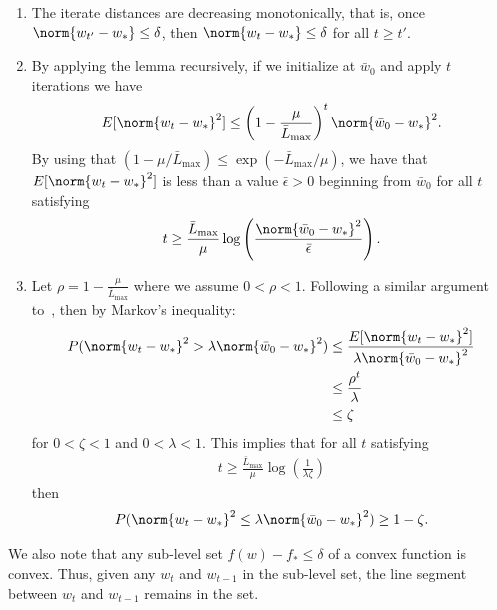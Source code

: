 \documentclass[10pt]{article} %
\begin{document}
\begin{enumerate}
    \item The iterate distances are decreasing monotonically, that is, once $\norm{w_{t'} - w_*} \leq \delta$, then $\norm{w_{t} - w_*} \leq \delta$ for all $t \geq t'$.
    \item By applying the lemma recursively, if we initialize at $\bar{w}_0$ and apply $t$ iterations we have
          \[
              E[\norm{w_t - w_*}^2] \leq \left(1 - \frac{\mu}{\bar{L}_{\text{max}}}\right)^t\norm{\bar{w}_0 - w_*}^2.
          \]
          By using that $(1-\mu/\bar{L}_{\text{max}})\leq \exp(-\bar{L}_{\text{max}}/\mu)$, we have that $E[\norm{w_t - w_*}^2]$ is less than a value $\bar{\epsilon} > 0$ beginning from $\bar{w}_0$ for all $t$ satisfying
          \begin{equation}
              \label{eq:SGDic-temp}
              t \geq \frac{\bar{L}_{\text{max}}}{\mu}\log\left(\frac{\norm{\bar{w}_0 - w_*}^2}{\bar{\epsilon}}\right).
          \end{equation}
    \item Let $\rho = 1 - \frac{\mu}{\bar{L}_{\text{max}}}$ where we assume $0 < \rho < 1$. Following a similar argument to~\cite[Theorem~5]{konevcny2017semi}, then by Markov's inequality:
          \begin{align*}
              P(\norm{w_{t} - w_{*}}^2 > \lambda\norm{\bar{w}_0 - w_{*}}^2)
               & \leq \frac{E[\norm{w_{t} - w_{*}}^2]}{\lambda\norm{\bar{w}_0 - w_{*}}^2} \\
               & \leq \frac{\rho^{t}}{\lambda}                                        \\
               & \leq \zeta
          \end{align*}
          for $0 < \zeta < 1$ and $0 < \lambda < 1$. This implies that for all $t$ satisfying 
          \begin{align}
          \label{eq:SGDic-hp-temp}
              t \geq \frac{\bar{L}_{\text{max}}}{\mu}\log(\frac{1}{\lambda\zeta})
          \end{align} then
          \begin{align}
              P(\norm{w_{t} - w_{*}}^2 \leq \lambda\norm{\bar{w}_0 - w_{*}}^2) \geq 1 - \zeta.
          \end{align}
\end{enumerate}
We also note that any sub-level set $f(w)-f_* \leq \delta$ of a convex function is convex. Thus, given any $w_t$ and $w_{t-1}$ in the sub-level set, the line segment between $w_t$ and $w_{t-1}$ remains in the set.
\end{document}
